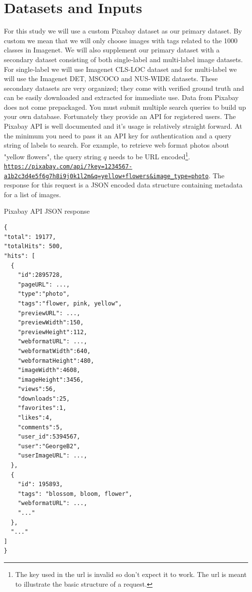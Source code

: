 \documentclass[10pt, a4paper, twocolumn]{article} %
\begin{document}
\section{Datasets and Inputs} %

For this study we will use a custom Pixabay dataset as our primary dataset.  By custom we mean that we will only choose images with tags related to the 1000 classes in Imagenet.  We will also supplement our primary dataset with a secondary dataset consisting of both single-label and multi-label image datasets.  For single-label we will use Imagenet CLS-LOC\citep{ILSVRC15} dataset and for multi-label we will use the Imagenet DET\citep{ILSVRC15}, MSCOCO\citep{MSCOCO} and NUS-WIDE\citep{nus-wide-civr09} datasets.  These secondary datasets are very organized; they come with verified ground truth and can be easily downloaded and extracted for immediate use.  Data from Pixabay does not come prepackaged.  You must submit multiple search queries to build up your own database.  Fortunately they provide an API for registered users\citep{Pixabay:API}. The Pixabay API is well documented and it's usage is relatively straight forward.  At the minimum you need to pass it an API key for authentication and a query string of labels to search.  For example, to retrieve web format photos about "yellow flowers", the query string $q$ needs to be URL encoded\footnote{The key used in the url is invalid so don't expect it to work.  The url is meant to illustrate the basic structure of a request.}. \href{}{\nolinkurl{https://pixabay.com/api/?key=1234567-a1b2c3d4e5f6g7h8i9j0k1l2m&q=yellow+flowers&image_type=photo}}. The response for this request is a JSON encoded data structure containing metadata for a list of images.

\begin{code}
\caption{Pixabay API JSON response}
\label{snip:api-response}
\begin{verbatim}
{
"total": 19177,
"totalHits": 500,
"hits": [
  {
    "id":2895728,
    "pageURL": ...,
    "type":"photo",
    "tags":"flower, pink, yellow",
    "previewURL": ...,
    "previewWidth":150,
    "previewHeight":112,
    "webformatURL": ...,
    "webformatWidth":640,
    "webformatHeight":480,
    "imageWidth":4608,
    "imageHeight":3456,
    "views":56,
    "downloads":25,
    "favorites":1,
    "likes":4,
    "comments":5,
    "user_id":5394567,
    "user":"GeorgeB2",
    "userImageURL": ...,
  },
  {
    "id": 195893,
    "tags": "blossom, bloom, flower",
    "webformatURL": ...,
    "..."
  },
  "..."
]
}
\end{verbatim}
\end{code}
\vspace{1mm}
\end{document}
